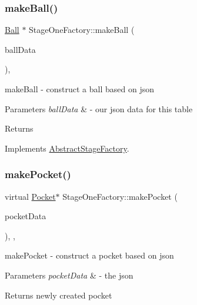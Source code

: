 \subsubsection{\texorpdfstring{make\+Ball()}{makeBall()}}
{\footnotesize\ttfamily \mbox{\hyperlink{class_ball}{Ball}} $\ast$ Stage\+One\+Factory\+::make\+Ball (\begin{DoxyParamCaption}\item[{const Q\+Json\+Object \&}]{ball\+Data }\end{DoxyParamCaption})\hspace{0.3cm}{\ttfamily [override]}, {\ttfamily [virtual]}}



make\+Ball -\/ construct a ball based on json 


\begin{DoxyParams}{Parameters}
{\em ball\+Data} & -\/ our json data for this table \\
\hline
\end{DoxyParams}
\begin{DoxyReturn}{Returns}

\end{DoxyReturn}


Implements \mbox{\hyperlink{class_abstract_stage_factory_a23367d64366e679aaff865620f5ce1ab}{Abstract\+Stage\+Factory}}.

\mbox{\label{class_stage_one_factory_ab9d7b7d74b61a2fd6c96562a67dc2fe8}} 
\subsubsection{\texorpdfstring{make\+Pocket()}{makePocket()}}
{\footnotesize\ttfamily virtual \mbox{\hyperlink{class_pocket}{Pocket}}$\ast$ Stage\+One\+Factory\+::make\+Pocket (\begin{DoxyParamCaption}\item[{const Q\+Json\+Object \&}]{pocket\+Data }\end{DoxyParamCaption})\hspace{0.3cm}{\ttfamily [inline]}, {\ttfamily [override]}, {\ttfamily [virtual]}}



make\+Pocket -\/ construct a pocket based on json 


\begin{DoxyParams}{Parameters}
{\em pocket\+Data} & -\/ the json \\
\hline
\end{DoxyParams}
\begin{DoxyReturn}{Returns}
newly created pocket 
\end{DoxyReturn}


